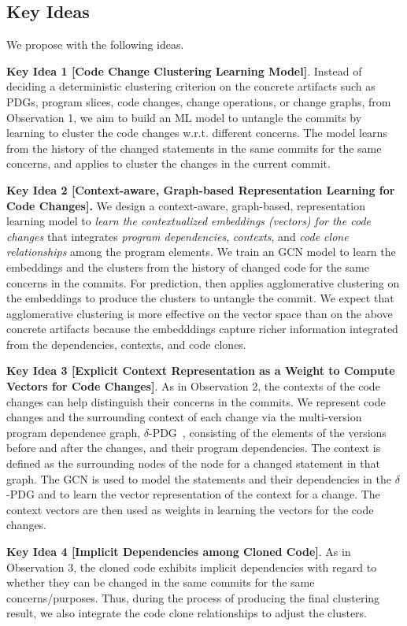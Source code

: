 \subsection{Key Ideas}
\label{ideas:sec}

We propose {\tool} with the following ideas.


{\bf Key Idea 1 [Code Change Clustering Learning Model]}. Instead of
deciding a deterministic clustering criterion on the concrete
artifacts such as PDGs, program slices, code changes, change
operations, or change graphs, from Observation 1, we aim to build an
ML model to untangle the commits by learning to cluster the code
changes w.r.t. different concerns. The model learns from the
history of the changed statements in the same commits for the same
concerns, and applies to cluster the changes in the current commit.

{\bf Key Idea 2 [Context-aware, Graph-based Representation Learning
    for Code Changes].} We design a context-aware, graph-based,
representation learning model to {\em learn the contextualized
  embeddings (vectors) for the code changes} that integrates {\em
  program dependencies}, {\em contexts}, and {\em code clone
  relationships} among the program elements. We train an GCN model to
learn the embeddings and the clusters from the history of changed code
for the same concerns in the commits. For prediction, {\tool} then
applies agglomerative clustering on the embeddings to produce the
clusters to untangle the commit. We expect that agglomerative
clustering is more effective on the vector space than on the above
concrete artifacts because the embedddings capture richer information
integrated from the dependencies, contexts, and code clones.


{\bf Key Idea 3 [Explicit Context Representation as a Weight to
    Compute Vectors for Code Changes]}. As in Observation 2, the
contexts of the code changes can help distinguish their
concerns in the commits. We represent code changes and the
surrounding context of each change via the multi-version program
dependence graph, $\delta$-PDG~\cite{flexeme-fse20}, consisting of the
elements of the versions before and after the changes, and their
program dependencies. The context is defined as the surrounding nodes
of the node for a changed statement in that graph. The GCN is used to
model the statements and their dependencies in the $\delta$-PDG and to
learn the vector representation of the context for a change. The
context vectors are then used as weights in learning the vectors for the
code changes.

{\bf Key Idea 4 [Implicit Dependencies among Cloned Code]}. As in
Observation 3, the cloned code exhibits implicit dependencies with
regard to whether they can be changed in the same commits for the same
concerns/purposes. Thus, during the process of producing the final
clustering result, we also integrate the code clone relationships to
adjust the clusters.

